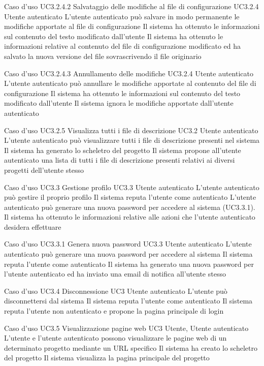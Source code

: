 \UCtitle
{Caso d'uso UC3.2.4.2}
{Salvataggio delle modifiche al file di configurazione}
\UC
{UC3.2.4}
{Utente autenticato}
{L'utente autenticato può salvare in modo permanente le modifiche apportate al file di configurazione}
{Il sistema ha ottenuto le informazioni sul contenuto del testo modificato dall'utente}
\post
{Il sistema ha ottenuto le informazioni relative al contenuto del file di configurazione modificato ed ha salvato la nuova versione del file sovrascrivendo il file originario}

\UCtitle
{Caso d'uso UC3.2.4.3}
{Annullamento delle modifiche}
\UC
{UC3.2.4}
{Utente autenticato}
{L'utente autenticato può annullare le modifiche apportate al contenuto del file di configurazione}
{Il sistema ha ottenuto le informazioni sul contenuto del testo modificato dall'utente}
\post
{Il sistema ignora le modifiche apportate dall'utente autenticato}

\UCtitle
{Caso d'uso UC3.2.5}
{Visualizza tutti i file di descrizione}
\UC
{UC3.2}
{Utente autenticato}
{L'utente autenticato può visualizzare tutti i file di descrizione presenti nel sistema}
{Il sistema ha generato lo scheletro del progetto}
\post
{Il sistema propone all'utente autenticato una lista di tutti i file di descrizione presenti relativi ai diversi progetti dell'utente stesso}


\UCtitle
{Caso d'uso UC3.3}
{Gestione profilo}
\UC
{UC3.3}
{Utente autenticato}
{L'utente autenticato può gestire il proprio profilo}
{Il sistema reputa l'utente come autenticato}
\scenario
{L'utente autenticato può generare una nuova password per accedere al sistema (UC3.3.1).}
\post
{Il sistema ha ottenuto le informazioni relative alle azioni che l'utente autenticato desidera effettuare}

\UCtitle
{Caso d'uso UC3.3.1}
{Genera nuova password}
\UC
{UC3.3}
{Utente autenticato}
{L'utente autenticato può generare una nuova password per accedere al sistema}
{Il sistema reputa l'utente come autenticato}
\post
{Il sistema ha generato una nuova password per l'utente autenticato ed ha inviato una email di notifica all'utente stesso}

\UCtitle
{Caso d'uso UC3.4}
{Disconnessione}
\UC
{UC3}
{Utente autenticato}
{L'utente può disconnettersi dal sistema}
{Il sistema reputa l'utente come autenticato}
\post
{Il sistema reputa l'utente non autenticato e propone la pagina principale di login}


\UCtitle
{Caso d'uso UC3.5}
{Visualizzazione pagine web}
\UC
{UC3}
{Utente, Utente autenticato}
{L'utente e l'utente autenticato possono visualizzare le pagine web di un determinato progetto mediante un URL specifico}
{Il sistema ha creato lo scheletro del progetto}
\post
{Il sistema visualizza la pagina principale del progetto}


